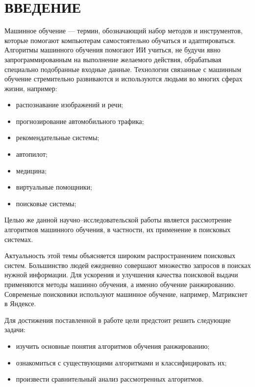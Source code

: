 \chapter*{ВВЕДЕНИЕ}

Машинное обучение --- термин, обозначающий набор методов и инструментов, которые помогают компьютерам самостоятельно обучаться и адаптироваться. Алгоритмы машинного обучения помогают ИИ учиться, не будучи явно запрограммированным на выполнение желаемого действия, обрабатывая специально подобранные входные данные. Технологии связанные с машинным обучение стремительно развиваются и используются людьми во многих сферах жизни, например:

\begin{itemize}[label=---]
	\item распознавание изображений и речи;
	\item прогнозирование автомобильного трафика;
	\item рекомендательные системы;
	\item автопилот;
	\item медицина;
	\item виртуальные помощники;
	\item поисковые системы;
\end{itemize}

Целью же данной научно--исследовательской работы является рассмотрение алгоритмов машинного обучения, в частности, их применение в поисковых системах.

Актуальность этой темы объясняется широким распространением поисковых систем. Большинство людей ежедневно совершают множество запросов в поисках нужной информации. Для ускорения и улучшения качества поисковой выдачи применяются методы машинно обучения, а именно обучение ранжированию. Современые поисковики используют машинное обучение, например, Матрикснет в Яндексе. 

Для достижения поставленной в работе цели предстоит решить следующие задачи:
\begin{itemize}[label=---]
    \item изучить основные понятия алгоритмов обучения ранжированию;
    \item ознакомиться с существующими алгоритмами и классифицировать их;
    \item произвести сравнительный анализ рассмотренных алгоритмов.
\end{itemize}


